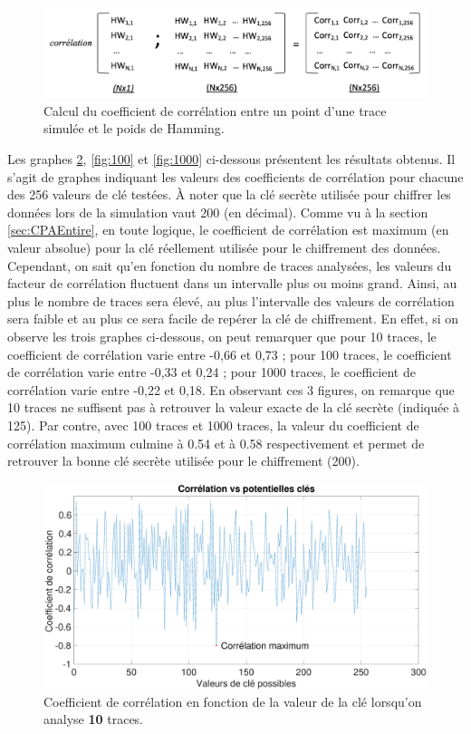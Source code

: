 \documentclass[10pt, oneside, a4paper]{article}
\begin{document}
\begin{figure}[htbp]
    \centering
    \includegraphics[scale=0.35]{image/CorrEx1}
    \caption{Calcul du coefficient de corrélation entre un point d'une trace simulée et le poids de Hamming.}
    \label{fig:CorrEx1} 
\end{figure}

\newpage

Les graphes \ref{fig:10}, \ref{fig:100} et \ref{fig:1000} ci-dessous présentent les résultats obtenus. Il s'agit de graphes indiquant les valeurs des coefficients de corrélation pour chacune des 256 valeurs de clé testées. À noter que la clé secrète utilisée pour chiffrer les données lors de la simulation vaut 200 (en décimal). Comme vu à la section \ref{sec:CPAEntire}, en toute logique, le coefficient de corrélation est maximum (en valeur absolue) pour la clé réellement utilisée pour le chiffrement des données. Cependant, on sait qu'en fonction du nombre de traces analysées, les valeurs du facteur de corrélation fluctuent dans un intervalle plus ou moins grand. Ainsi, au plus le nombre de traces sera élevé, au plus l'intervalle des valeurs de corrélation sera faible et au plus ce sera facile de repérer la clé de chiffrement. En effet, si on observe les trois graphes ci-dessous, on peut remarquer que pour 10 traces, le coefficient de corrélation varie entre -0,66 et 0,73 ; pour 100 traces, le coefficient de corrélation varie entre -0,33 et 0,24 ; pour 1000 traces, le coefficient de corrélation varie entre -0,22 et 0,18. En observant ces 3 figures, on remarque que 10 traces ne suffisent pas à retrouver la valeur exacte de la clé secrète (indiquée à 125). Par contre, avec 100 traces et 1000 traces, la valeur du coefficient de corrélation maximum culmine à 0.54 et à 0.58 respectivement et permet de retrouver la bonne clé secrète utilisée pour le chiffrement (200).

\begin{figure}[htbp]
    \centering
    \hspace{-1.2 cm}
    \includegraphics[scale=0.25]{image/10.eps}    \caption{Coefficient de corrélation en fonction de la valeur de la clé lorsqu'on analyse \textbf{10} traces.}    \label{fig:10}
\end{figure}
\end{document}

